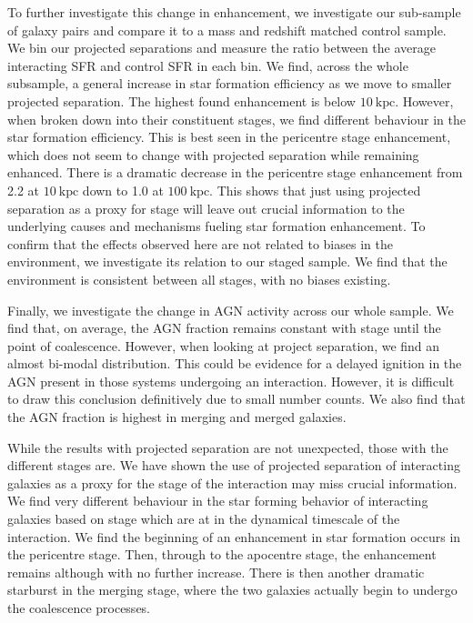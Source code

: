 To further investigate this change in enhancement, we investigate our sub-sample of galaxy pairs and compare it to a mass and redshift matched control sample. We bin our projected separations and measure the ratio between the average interacting SFR and control SFR in each bin. We find, across the whole subsample, a general increase in star formation efficiency as we move to smaller projected separation. The highest found enhancement is below $10~\mathrm{kpc}$. However, when broken down into their constituent stages, we find different behaviour in the star formation efficiency. This is best seen in the pericentre stage enhancement, which does not seem to change with projected separation while remaining enhanced. There is a dramatic decrease in the pericentre stage enhancement from 2.2 at $10~\mathrm{kpc}$ down to 1.0 at $100~\mathrm{kpc}$. This shows that just using projected separation as a proxy for stage will leave out crucial information to the underlying causes and mechanisms fueling star formation enhancement. To confirm that the effects observed here are not related to biases in the environment, we investigate its relation to our staged sample. We find that the environment is consistent between all stages, with no biases existing.

Finally, we investigate the change in AGN activity across our whole sample. We find that, on average, the AGN fraction remains constant with stage until the point of coalescence. However, when looking at project separation, we find an almost bi-modal distribution. This could be evidence for a delayed ignition in the AGN present in those systems undergoing an interaction. However, it is difficult to draw this conclusion definitively due to small number counts. We also find that the AGN fraction is highest in merging and merged galaxies.

While the results with projected separation are not unexpected, those with the different stages are. We have shown the use of projected separation of interacting galaxies as a proxy for the stage of the interaction may miss crucial information. We find very different behaviour in the star forming behavior of interacting galaxies based on stage which are at in the dynamical timescale of the interaction. We find the beginning of an enhancement in star formation occurs in the pericentre stage. Then, through to the apocentre stage, the enhancement remains although with no further increase. There is then another dramatic starburst in the merging stage, where the two galaxies actually begin to undergo the coalescence processes.

